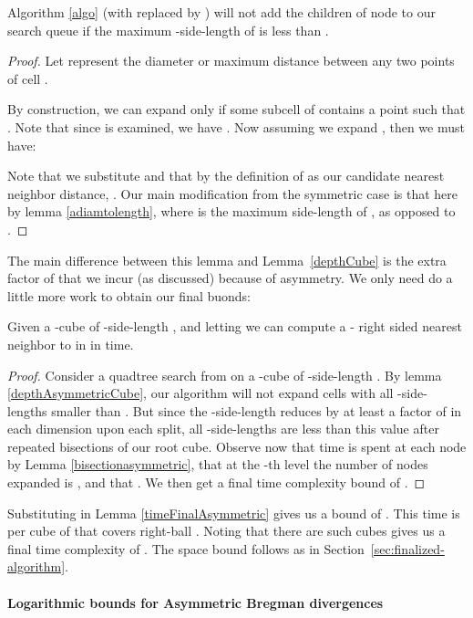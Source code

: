 \documentclass[11pt]{myclass}
\begin{document}
\begin{lemma}\label{depthAsymmetricCube}
Algorithm \ref{algo} (with  replaced by ) will not add the children of node   to our search queue 
if the maximum -side-length of  is less than .
\end{lemma}
\begin{proof}
Let  represent the diameter or maximum distance between any two points of cell .

By construction, we can expand  only if some subcell of  contains a point  
such that . Note that since  is examined, 
we have .
 Now assuming we expand , then we must have:

Note that we substitute  and that by the definition of  
as our candidate nearest neighbor distance,  . 
Our main modification from the symmetric case is that here 
 by lemma \ref{adiamtolength},  where  is the maximum side-length of , 
as opposed to . 
\end{proof}

The main difference between this lemma and Lemma~\ref{depthCube} is the extra factor of  that we incur 
(as discussed) because of asymmetry. We only need do a little more work to obtain our final buonds:
\begin{lemma}\label{timeFinalAsymmetric}
Given a -cube  of -side-length , and letting   we can compute a - right sided nearest neighbor to  in  
in  time.
\end{lemma}

\begin{proof}
Consider a quadtree search from  on a -cube  of -side-length . By lemma \ref{depthAsymmetricCube},
 our algorithm will not expand cells with all -side-lengths smaller than  .
 But since the -side-length reduces by at least a factor of  in each dimension upon each split, 
all -side-lengths are less than this value after   repeated bisections of our root cube. Observe now that  time is spent at each node by Lemma \ref{bisectionasymmetric}, that at the -th level the 
number of nodes expanded is , and that .
We then get a final time complexity bound of 
. 
\qedhere
\end{proof}

Substituting  in Lemma \ref{timeFinalAsymmetric} gives us a  bound of .  This time is per cube of  that covers right-ball . Noting that there are  such cubes gives us a final time complexity of . The space bound follows as in Section~\ref{sec:finalized-algorithm}. 


\paragraph{Logarithmic bounds for Asymmetric Bregman divergences}
\label{subsec:assymcondition}
\end{document}
